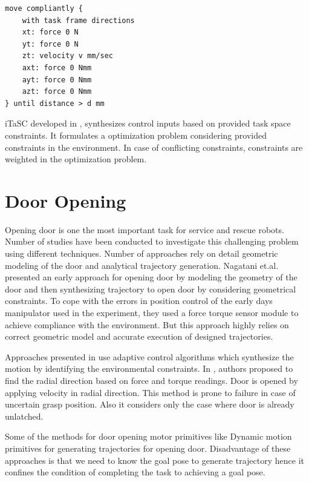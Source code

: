 \documentclass[thesis]{mas_proposal}
\begin{document}
\begin{lstlisting}[label=tff,caption=Task Specification using TFF: Open Door]
move compliantly {
	with task frame directions
	xt: force 0 N
	yt: force 0 N
	zt: velocity v mm/sec
	axt: force 0 Nmm
	ayt: force 0 Nmm
	azt: force 0 Nmm
} until distance > d mm 
\end{lstlisting}


iTaSC developed in \cite{DeSchutter-ijrr2007, DecreBruyninckxDeSchutter2013, decre09}, synthesizes control inputs based on provided task space constraints. It formulates a optimization problem considering provided constraints in the environment. In case of conflicting constraints, constraints are weighted in the optimization problem.  


\section{Door Opening}

Opening door is one the most important task for service and rescue robots. Number of studies have been conducted to investigate this challenging problem using different techniques. Number of approaches rely on detail geometric modeling of the door and analytical trajectory generation. Nagatani et.al. \cite{nagatani1995experiment} presented an early approach for opening door by modeling the geometry of the door and then synthesizing trajectory to open door by considering geometrical constraints. To cope with the errors in position control of the early days manipulator used in the experiment, they used a force torque sensor module to achieve compliance with the environment. But this approach highly relies on correct geometric model and accurate execution of designed trajectories.

Approaches presented in \cite{levihn2014using,karayiannidis2012adaptive,niemeyer1997simple} use adaptive control algorithms which synthesize the motion by identifying the environmental constraints. In \cite{karayiannidis2012adaptive}, authors proposed to find the radial direction based on force and torque readings. Door is opened by applying velocity in radial direction. This method is prone to failure in case of uncertain grasp position. Also it considers only the case where door is already unlatched. 

Some of the methods for door opening motor primitives like Dynamic motion primitives for generating trajectories for opening door. Disadvantage of these approaches is that we need to know the goal pose to generate trajectory hence it confines the condition of completing the task to achieving a goal pose. 
\end{document}
